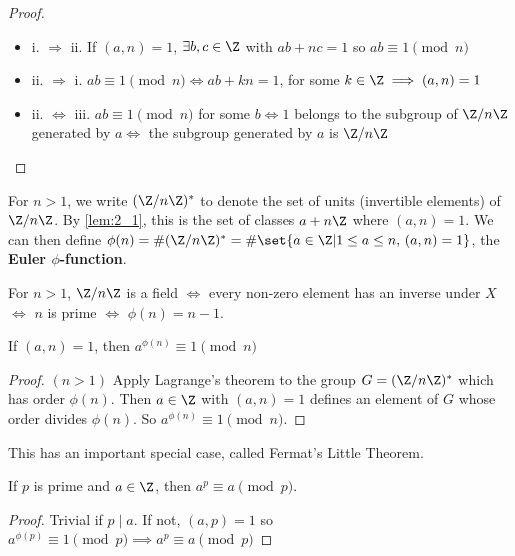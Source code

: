 \documentclass{article}
\begin{document}
\begin{proof}
    \leavevmode
    \begin{itemize}[label={}]
        \item i. $\Rightarrow$ ii. If $(a, n) = 1$, $\exists b, c \in \Z$ with $ab+nc=1$ so $ab \equiv 1 \pmod{n}$
        \item ii. $\Rightarrow$ i. $ab \equiv 1 \pmod{n} \iff ab+kn=1$, for some $k \in \Z \implies (a, n)= 1$
        \item ii. $\Leftrightarrow$ iii. $ab \equiv 1 \pmod{n}$ for some $b \iff 1$ belongs to the subgroup of $\Z / n \Z$ generated by $a \iff$ the subgroup generated by $a$ is $\Z / n \Z$
    \end{itemize}
\end{proof}

\begin{notation}
    For $n > 1$, we write $(\Z / n \Z)^*$ to denote the set of units (invertible elements) of $\Z / n \Z$. By \cref{lem:2_1}, this is the set of classes $a + n \Z$ where $(a, n) = 1$.
    We can then define $\phi(n) =\# (\Z / n \Z)^* = \# \set{a \in \Z | 1 \leq a \leq n, \, (a, n) = 1}$, the \textbf{Euler $\phi$-function}.
\end{notation}

\begin{remark}
    For $n>1$, $\Z/n\Z$ is a field $\iff$ every non-zero element has an inverse under $X$ $\iff$ $n$ is prime $\iff$ $\phi(n) = n-1$.
\end{remark}

\begin{thm}
    If $(a, n) = 1$, then $a^{\phi(n)} \equiv 1 \pmod{n}$
\end{thm}

\begin{proof}
    $(n>1)$ Apply Lagrange's theorem to the group $G = (\Z/n\Z)^*$ which has order $\phi(n)$. Then $a \in \Z$ with $(a, n) = 1$ defines an element of $G$ whose order divides $\phi(n)$. So $a^{\phi(n)} \equiv 1 \pmod{n}$.
\end{proof}

This has an important special case, called Fermat's Little Theorem.
\begin{thm}
    If $p$ is prime and $a \in \Z$, then $a^p \equiv a \pmod{p}$.
\end{thm}

\begin{proof}
    Trivial if $p \mid a$.  If not, $(a, p) = 1$ so $a^{\phi(p)} \equiv 1 \pmod{p} \implies a^p \equiv a \pmod{p}$
\end{proof}
\end{document}
